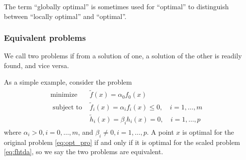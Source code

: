\documentclass{article}
\newcommand{\bfs}[1]{\textbf{({#1}) }}
\begin{document}
\begin{rema}
The term ``globally optimal'' is sometimes used for ``optimal'' to distinguish between ``locally optimal'' and ``optimal''.
\end{rema}

\subsubsection{Equivalent problems}
We call two problems  if from a solution of one, a solution of the other is readily found, and vice versa. 

\begin{exma}
As a simple example, consider the problem
\begin{align}
\begin{array}{ll}
\operatorname{minimize} & \tilde{f}(x)=\alpha_{0} f_{0}(x) \\
\text { subject to } & \tilde{f}_{i}(x)=\alpha_{i} f_{i}(x) \leq 0, \quad i=1, \ldots, m \\
& \tilde{h}_{i}(x)=\beta_{i} h_{i}(x)=0, \quad i=1, \ldots, p
\end{array}\label{eq:fhtda}
\end{align}
where $\alpha_{i}>0, i=0, \ldots, m$, and $\beta_{i} \neq 0, i=1, \ldots, p .$  A point $x$ is optimal for the original problem \cref{eq:opt_pro} if and only if it is optimal for the scaled problem \cref{eq:fhtda}, so we say the two problems are equivalent.
\end{exma}
\end{document}
